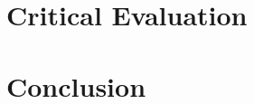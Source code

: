 \documentclass[ %
                    author={Alexander Hill},
                supervisor={Dr. Benjamin Sach},
                    degree={MEng},
                     title={MARMOSET},
                  subtitle={Multi-Agent Route Management using Online Simulation for Efficient Transportation},
                      type={research},
                      year={2016} ]{dissertation}
\begin{document}


\chapter{Critical Evaluation}
\label{chap:evaluation}






\chapter{Conclusion}
\label{chap:conclusion}
\end{document}
